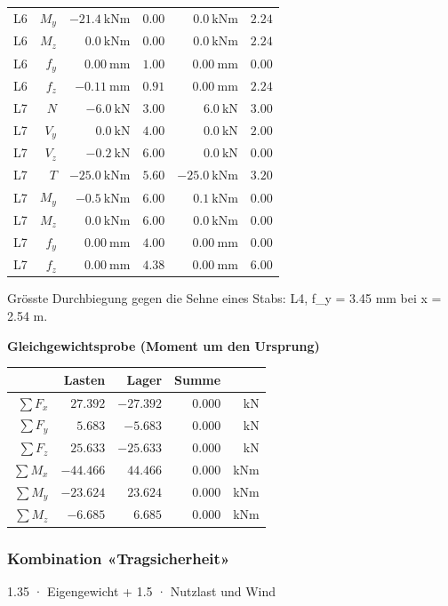 \documentclass[11pt,a4paper]{article}
\begin{document}
\begin{longtable}{rrrrrr}
L6 & $M_y$ & $-21.4\ \mathrm{kNm}$ & $0.00$ & $0.0\ \mathrm{kNm}$ & $2.24$ \\
L6 & $M_z$ & $0.0\ \mathrm{kNm}$ & $0.00$ & $0.0\ \mathrm{kNm}$ & $2.24$ \\
L6 & $f_y$ & $0.00\ \mathrm{mm}$ & $1.00$ & $0.00\ \mathrm{mm}$ & $0.00$ \\
L6 & $f_z$ & $-0.11\ \mathrm{mm}$ & $0.91$ & $0.00\ \mathrm{mm}$ & $2.24$ \\
L7 & $N$ & $-6.0\ \mathrm{kN}$ & $3.00$ & $6.0\ \mathrm{kN}$ & $3.00$ \\
L7 & $V_y$ & $0.0\ \mathrm{kN}$ & $4.00$ & $0.0\ \mathrm{kN}$ & $2.00$ \\
L7 & $V_z$ & $-0.2\ \mathrm{kN}$ & $6.00$ & $0.0\ \mathrm{kN}$ & $0.00$ \\
L7 & $T$ & $-25.0\ \mathrm{kNm}$ & $5.60$ & $-25.0\ \mathrm{kNm}$ & $3.20$ \\
L7 & $M_y$ & $-0.5\ \mathrm{kNm}$ & $6.00$ & $0.1\ \mathrm{kNm}$ & $0.00$ \\
L7 & $M_z$ & $0.0\ \mathrm{kNm}$ & $6.00$ & $0.0\ \mathrm{kNm}$ & $0.00$ \\
L7 & $f_y$ & $0.00\ \mathrm{mm}$ & $4.00$ & $0.00\ \mathrm{mm}$ & $0.00$ \\
L7 & $f_z$ & $0.00\ \mathrm{mm}$ & $4.38$ & $0.00\ \mathrm{mm}$ & $6.00$ \\
\hline
\end{longtable}
Grösste Durchbiegung gegen die Sehne eines Stabs: L4, f\_y = 3.45 mm bei x = 2.54 m.

\noindent\textbf{Gleichgewichtsprobe (Moment um den Ursprung)}
\begin{longtable}{rrrrr}
\hline
 & Lasten & Lager & Summe &  \\
\hline
\endhead
$\sum F_x$ & $27.392$ & $-27.392$ & $0.000$ & kN \\
$\sum F_y$ & $5.683$ & $-5.683$ & $0.000$ & kN \\
$\sum F_z$ & $25.633$ & $-25.633$ & $0.000$ & kN \\
$\sum M_x$ & $-44.466$ & $44.466$ & $0.000$ & kNm \\
$\sum M_y$ & $-23.624$ & $23.624$ & $0.000$ & kNm \\
$\sum M_z$ & $-6.685$ & $6.685$ & $0.000$ & kNm \\
\hline
\end{longtable}
\subsubsection{Kombination «Tragsicherheit»}
1.35 · Eigengewicht + 1.5 · Nutzlast und Wind
\end{document}
